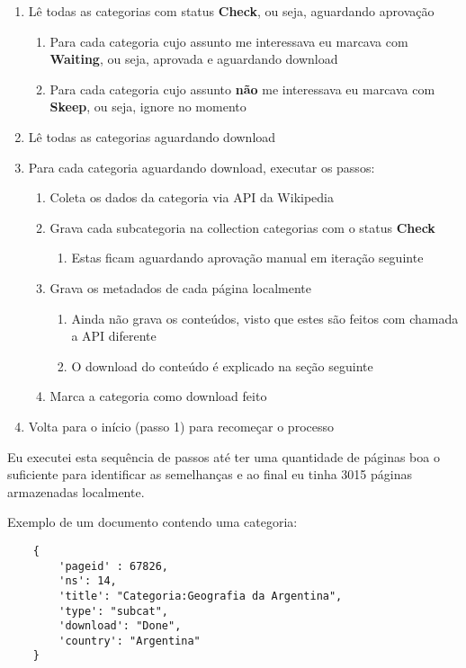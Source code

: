 \begin{enumerate}
    \item Lê todas as categorias com status \textbf{Check}, ou seja, aguardando aprovação
    \begin{enumerate}
        \item Para cada categoria cujo assunto me interessava eu marcava com \textbf{Waiting}, ou seja, aprovada e aguardando download
        \item Para cada categoria cujo assunto \textbf{não} me interessava eu marcava com \textbf{Skeep}, ou seja, ignore no momento
    \end{enumerate}
    \item Lê todas as categorias aguardando download
    \item Para cada categoria aguardando download, executar os passos: 
    \begin{enumerate}
        \item Coleta os dados da categoria via API da Wikipedia
        \item Grava cada subcategoria na collection categorias com o status \textbf{Check}
        \begin{enumerate}
            \item Estas ficam aguardando aprovação manual em iteração seguinte
        \end{enumerate}
        \item Grava os metadados de cada página localmente
        \begin{enumerate}
            \item Ainda não grava os conteúdos, visto que estes são feitos com chamada a API diferente
            \item O download do conteúdo é explicado na seção seguinte
        \end{enumerate}
        \item Marca a categoria como download feito
    \end{enumerate}
    \item Volta para o início (passo 1) para recomeçar o processo
\end{enumerate}

Eu executei esta sequência de passos até ter uma quantidade de páginas boa o suficiente para identificar as semelhanças e ao final eu tinha 
3015 páginas armazenadas localmente.

Exemplo de um documento contendo uma categoria:

\begin{lstlisting}
    {
        'pageid' : 67826,
        'ns': 14,
        'title': "Categoria:Geografia da Argentina",
        'type': "subcat",
        'download': "Done",
        'country': "Argentina"
    }
\end{lstlisting}


